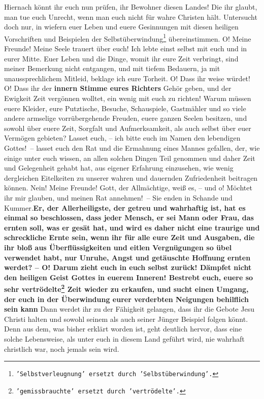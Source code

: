 Hiernach könnt ihr euch nun prüfen, ihr Bewohner diesen Landes! Die ihr glaubt,
man tue euch Unrecht, wenn man euch nicht für wahre Christen hält. Untersucht
doch nur, in wiefern euer Leben und euere Gesinnungen mit diesen heiligen
Vorschriften und Beispielen der
Selbstüberwindung\footnote{\texttt{'Selbstverleugnung'
ersetzt durch 'Selbstüberwindung'.}} übereinstimmen. O! Meine
Freunde! Meine Seele trauert über euch! \label{15_04_penn_alte_freunde} Ich
lebte einst selbst mit euch und in
eurer Mitte. Euer Leben und die Dinge, womit ihr eure Zeit verbringt, sind
meiner Bemerkung nicht entgangen, und mit tiefem Bedauern, ja mit
unaussprechlichem Mitleid, beklage ich eure Torheit. O! Dass ihr weise würdet!
O! Dass ihr der
\label{ref:15_04_innere_stimme}
\textbf{innern Stimme eures Richters} Gehör geben, und der Ewigkeit Zeit
vergönnen wolltet, ein wenig mit euch zu richten! Warum müssen euere Kleider,
eure Putztische, Besuche, Schauspiele, Gastmähler und so viele andere armselige
vorrübergehende Freuden, euere ganzen Seelen besitzen, und sowohl über euere
Zeit,
Sorgfalt und Aufmerksamkeit, als auch selbst über euer Vermögen gebieten? Lasset
euch, -- ich bitte euch im Namen den lebendigen Gottes!~-- lasset euch den Rat
und die Ermahnung eines Mannes gefallen, der, wie einige unter euch wissen, an
allen solchen Dingen Teil genommen und daher Zeit und Gelegenheit gehabt hat,
aus eigener Erfahrung einzusehen, wie wenig dergleichen Eitelkeiten zu unserer
wahren und dauernden Zufriedenheit beitragen können. Nein!
Meine Freunde! Gott,
der Allmächtige, weiß es, -- und o! Möchtet ihr mir
glauben, und meinen Rat
annehmen!~-- Sie enden in Schande und Kummer.\textbf{Er, der Allerheiligste, der
getreu
und wahrhaftig ist, hat es einmal so beschlossen, dass jeder Mensch, er sei Mann
oder Frau, das ernten soll, was er gesät hat, und wird es daher nicht eine
traurige und schreckliche Ernte sein, wenn ihr für alle eure Zeit und Ausgaben,
die ihr bloß aus Überflüssigkeiten und eitlen Vergnügungen so übel verwendet
habt, nur Unruhe, Angst und getäuschte Hoffnung ernten werdet? -- O! Darum
zieht euch in euch selbst zurück! Dämpfet nicht den heiligen Geist Gottes in
euerem Inneren! Bestrebt euch, euere so sehr
vertrödelte\footnote{\texttt{'gemissbrauchte' ersetzt
durch 'vertrödelte'.}} Zeit wieder zu
erkaufen, und sucht einen Umgang, der euch in der Überwindung eurer verderbten
Neigungen behilflich sein kann} Dann werdet ihr zu der Fähigkeit gelangen, dass
ihr die Gebote Jesu Christi halten und sowohl seinem als auch seiner Jünger
Beispiel folgen könnt. Denn aus dem, was bisher erklärt worden ist, geht
deutlich hervor, dass eine solche Lebensweise, als unter euch in diesem Land
geführt wird, nie wahrhaft christlich war, noch jemals sein wird.

